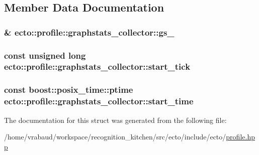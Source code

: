 \subsection{Member Data Documentation}
\hypertarget{structecto_1_1profile_1_1graphstats__collector_a4a6ceeeffacb5f69edc173d5aaf3cf89}{
\subsubsection[{gs\-\_\-}]{\& ecto\-::profile\-::graphstats\-\_\-collector\-::gs\-\_\-}}\label{structecto_1_1profile_1_1graphstats__collector_a4a6ceeeffacb5f69edc173d5aaf3cf89}
\hypertarget{structecto_1_1profile_1_1graphstats__collector_a7a840b075fd490da5107ea538614d017}{
\subsubsection[{start\-\_\-tick}]{\setlength{\rightskip}{0pt plus 5cm}const unsigned long ecto\-::profile\-::graphstats\-\_\-collector\-::start\-\_\-tick}}\label{structecto_1_1profile_1_1graphstats__collector_a7a840b075fd490da5107ea538614d017}
\hypertarget{structecto_1_1profile_1_1graphstats__collector_a85cb67d72c9d1072634b879776e2e4b8}{
\subsubsection[{start\-\_\-time}]{\setlength{\rightskip}{0pt plus 5cm}const boost\-::posix\-\_\-time\-::ptime ecto\-::profile\-::graphstats\-\_\-collector\-::start\-\_\-time}}\label{structecto_1_1profile_1_1graphstats__collector_a85cb67d72c9d1072634b879776e2e4b8}


The documentation for this struct was generated from the following file\-:\begin{DoxyCompactItemize}
\item 
/home/vrabaud/workspace/recognition\-\_\-kitchen/src/ecto/include/ecto/\hyperlink{profile_8hpp}{profile.\-hpp}\end{DoxyCompactItemize}
